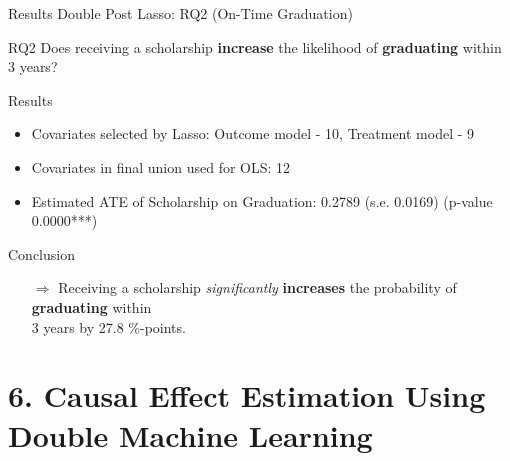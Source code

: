 \documentclass[aspectratio=169]{beamer}
\begin{document}
\begin{frame}{Results Double Post Lasso: RQ2 (On-Time Graduation)}
\hypertarget{main-slide2}{}
\vspace{20pt}
\begin{alertblock}{RQ2}
	Does receiving a scholarship \textbf{increase} the likelihood of \textbf{graduating} within 3 years?
\end{alertblock}

\begin{block}{Results}
\begin{itemize}[label=--,itemsep=1pt,topsep=2pt]
	\item Covariates selected by Lasso: Outcome model - 10, Treatment model - 9
	\item Covariates in final union used for OLS: 12
	\item Estimated ATE of Scholarship on Graduation: 0.2789 (s.e. 0.0169) (p-value 0.0000***)
\end{itemize}
\end{block}

\begin{exampleblock}{Conclusion}
\vspace{-3pt}
\begin{itemize}
	\item [$\Rightarrow$]Receiving a scholarship \textit{significantly} \textbf{increases} the probability of \textbf{graduating} within \\ 3 years by 27.8 \%-points.
\end{itemize}
\vspace{-3pt}	
\end{exampleblock}
\raggedleft
\hyperlink{appendix-slide2}{}
\end{frame}

\section{6. Causal Effect Estimation Using Double Machine Learning}
\end{document}
